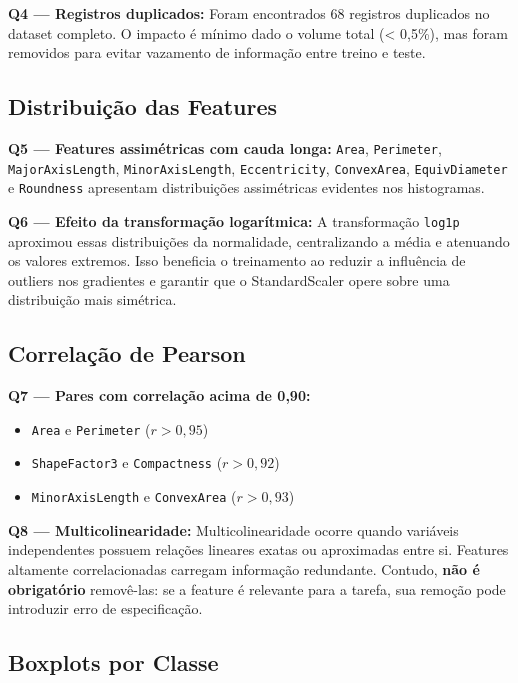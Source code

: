 \documentclass[12pt,a4paper]{article}
\begin{document}
\textbf{Q4 — Registros duplicados:}
Foram encontrados 68 registros duplicados no dataset completo.
O impacto é mínimo dado o volume total (< 0,5\%), mas foram removidos
para evitar vazamento de informação entre treino e teste.

\subsection{Distribuição das Features}

\textbf{Q5 — Features assimétricas com cauda longa:}
\texttt{Area}, \texttt{Perimeter}, \texttt{MajorAxisLength},
\texttt{MinorAxisLength}, \texttt{Eccentricity}, \texttt{ConvexArea},
\texttt{EquivDiameter} e \texttt{Roundness} apresentam distribuições
assimétricas evidentes nos histogramas.

\textbf{Q6 — Efeito da transformação logarítmica:}
A transformação \texttt{log1p} aproximou essas distribuições da normalidade,
centralizando a média e atenuando os valores extremos.
Isso beneficia o treinamento ao reduzir a influência de outliers nos gradientes
e garantir que o StandardScaler opere sobre uma distribuição mais simétrica.

\subsection{Correlação de Pearson}

\textbf{Q7 — Pares com correlação acima de 0,90:}
\begin{itemize}
    \item \texttt{Area} e \texttt{Perimeter} ($r > 0{,}95$)
    \item \texttt{ShapeFactor3} e \texttt{Compactness} ($r > 0{,}92$)
    \item \texttt{MinorAxisLength} e \texttt{ConvexArea} ($r > 0{,}93$)
\end{itemize}

\textbf{Q8 — Multicolinearidade:}
Multicolinearidade ocorre quando variáveis independentes possuem relações
lineares exatas ou aproximadas entre si.  Features altamente correlacionadas
carregam informação redundante.  Contudo, \textbf{não é obrigatório} removê-las:
se a feature é relevante para a tarefa, sua remoção pode introduzir erro de
especificação.

\subsection{Boxplots por Classe}
\end{document}
